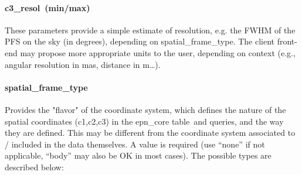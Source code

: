 \documentclass[11pt,a4paper]{ivoa}
\begin{document}
\paragraph{c3\_resol (min/max)}

These parameters provide a simple estimate of resolution, e.g. the FWHM of the PFS on the sky (in degrees), depending on spatial\_frame\_type. The client front-end may propose more appropriate units to the user, depending on context (e.g., angular resolution in mas, distance in m…).

\paragraph{spatial\_frame\_type}

Provides the "flavor" of the coordinate system, which defines the nature of the spatial coordinates (c1,c2,c3) in the epn\_core table and queries, and the way they are defined. This may be different from the coordinate system associated to / included in the data themselves. A value is required (use ``none'' if not applicable, ``body'' may also be OK in most cases). The possible types are described below:
\end{document}
